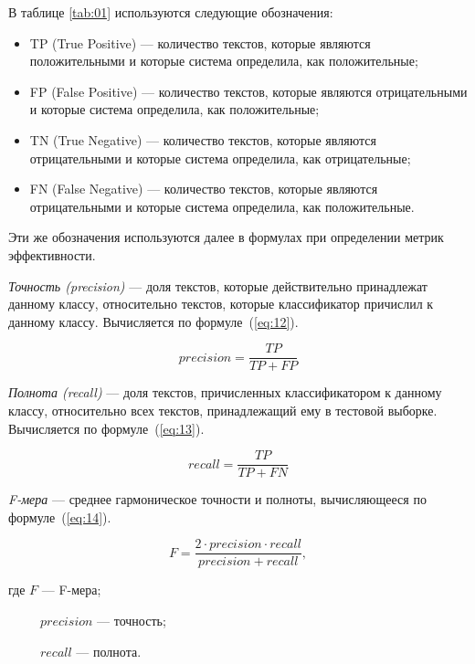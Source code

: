 В таблице \ref{tab:01} используются следующие обозначения:
\begin{itemize}
    \item TP (True Positive) --- количество текстов, которые являются
        положительными и которые система определила, как положительные;
    \item FP (False Positive) --- количество текстов, которые являются
        отрицательными и которые система определила, как положительные;
    \item TN (True Negative) --- количество текстов, которые являются
        отрицательными и которые система определила, как отрицательные;
    \item FN (False Negative) --- количество текстов, которые являются
        отрицательными и которые система определила, как положительные.
\end{itemize}

Эти же обозначения используются далее в формулах при определении метрик
эффективности.

\textit{Точность (precision)} --- доля текстов, которые действительно принадлежат данному
классу, относительно текстов, которые классификатор причислил к данному
классу. Вычисляется по формуле~(\ref{eq:12}).

\begin{equation}\label{eq:12}
    precision = \frac{TP}{TP + FP}
\end{equation}

\textit{Полнота (recall)} --- доля текстов, причисленных классификатором к
данному классу, относительно всех текстов, принадлежащий ему в тестовой
выборке. Вычисляется по формуле~(\ref{eq:13}).

\begin{equation}\label{eq:13}
    recall = \frac{TP}{TP + FN}
\end{equation}

\textit{F-мера} --- среднее гармоническое точности и полноты, вычисляющееся
по формуле~(\ref{eq:14}).

\begin{equation}\label{eq:14}
    F = \frac{2 \cdot precision \cdot recall}{precision + recall},
\end{equation}

где $F$ --- F-мера;

~~~~~$precision$ --- точность;

~~~~~$recall$ --- полнота.



